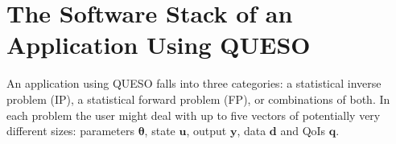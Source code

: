 \section{The Software Stack of an Application Using QUESO}



An application using QUESO falls into three categories: a statistical inverse problem (IP), a statistical forward problem (FP), or combinations of both.
In each problem the user might deal with up to five vectors of potentially very different sizes:
parameters $\boldsymbol{\theta}$, state $\mathbf{u}$, output $\mathbf{y}$, data $\mathbf{d}$ and QoIs $\mathbf{q}$.

